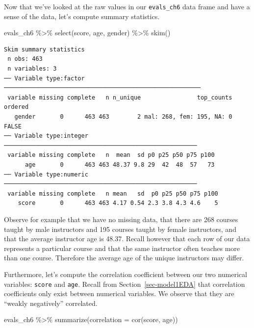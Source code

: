 \documentclass[
  letterpaper,
  DIV=11,
  numbers=noendperiod]{scrreprt}
\newenvironment{Shaded}{\begin{snugshade}}{\end{snugshade}}
\newcommand{\AttributeTok}[1]{\textcolor[rgb]{0.40,0.45,0.13}{#1}}
\newcommand{\FunctionTok}[1]{\textcolor[rgb]{0.28,0.35,0.67}{#1}}
\newcommand{\NormalTok}[1]{\textcolor[rgb]{0.00,0.23,0.31}{#1}}
\newcommand{\SpecialCharTok}[1]{\textcolor[rgb]{0.37,0.37,0.37}{#1}}
\theoremstyle{definition}
\theoremstyle{remark}
\begin{document}
Now that we've looked at the raw values in our \texttt{evals\_ch6} data
frame and have a sense of the data, let's compute summary statistics.

\begin{Shaded}
\begin{Highlighting}[]
\NormalTok{evals\_ch6 }\SpecialCharTok{\%\textgreater{}\%} 
  \FunctionTok{select}\NormalTok{(score, age, gender) }\SpecialCharTok{\%\textgreater{}\%} 
  \FunctionTok{skim}\NormalTok{()}
\end{Highlighting}
\end{Shaded}

\begin{verbatim}
Skim summary statistics
 n obs: 463 
 n variables: 3 
── Variable type:factor ────────────────────────────────────────────────────────
 variable missing complete   n n_unique                top_counts ordered
   gender       0      463 463        2 mal: 268, fem: 195, NA: 0   FALSE
── Variable type:integer ───────────────────────────────────────────────────────
 variable missing complete   n  mean  sd p0 p25 p50 p75 p100
      age       0      463 463 48.37 9.8 29  42  48  57   73
── Variable type:numeric ───────────────────────────────────────────────────────
 variable missing complete   n mean   sd  p0 p25 p50 p75 p100
    score       0      463 463 4.17 0.54 2.3 3.8 4.3 4.6    5
\end{verbatim}

Observe for example that we have no missing data, that there are 268
courses taught by male instructors and 195 courses taught by female
instructors, and that the average instructor age is 48.37. Recall
however that each row of our data represents a particular course and
that the same instructor often teaches more than one course. Therefore
the average age of the unique instructors may differ.

Furthermore, let's compute the correlation coefficient between our two
numerical variables: \texttt{score} and \texttt{age}. Recall from
Section~\ref{sec-model1EDA} that correlation coefficients only exist
between numerical variables. We observe that they are ``weakly
negatively'' correlated.

\begin{Shaded}
\begin{Highlighting}[]
\NormalTok{evals\_ch6 }\SpecialCharTok{\%\textgreater{}\%} 
  \FunctionTok{summarize}\NormalTok{(}\AttributeTok{correlation =} \FunctionTok{cor}\NormalTok{(score, age))}
\end{Highlighting}
\end{Shaded}
\end{document}
